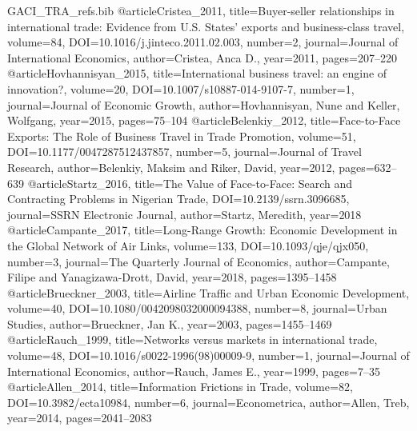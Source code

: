 \begin{filecontents*}[overwrite]{GACI_TRA_refs.bib}
@article{Cristea_2011, title={Buyer-seller relationships in international trade: Evidence from U.S. States' exports and business-class travel}, volume={84}, DOI={10.1016/j.jinteco.2011.02.003}, number={2}, journal={Journal of International Economics}, author={Cristea, Anca D.}, year={2011}, pages={207--220} }
@article{Hovhannisyan_2015, title={International business travel: an engine of innovation?}, volume={20}, DOI={10.1007/s10887-014-9107-7}, number={1}, journal={Journal of Economic Growth}, author={Hovhannisyan, Nune and Keller, Wolfgang}, year={2015}, pages={75--104} }
@article{Belenkiy_2012, title={Face-to-Face Exports: The Role of Business Travel in Trade Promotion}, volume={51}, DOI={10.1177/0047287512437857}, number={5}, journal={Journal of Travel Research}, author={Belenkiy, Maksim and Riker, David}, year={2012}, pages={632--639} }
@article{Startz_2016, title={The Value of Face-to-Face: Search and Contracting Problems in Nigerian Trade}, DOI={10.2139/ssrn.3096685}, journal={SSRN Electronic Journal}, author={Startz, Meredith}, year={2018} }
@article{Campante_2017, title={Long-Range Growth: Economic Development in the Global Network of Air Links}, volume={133}, DOI={10.1093/qje/qjx050}, number={3}, journal={The Quarterly Journal of Economics}, author={Campante, Filipe and Yanagizawa-Drott, David}, year={2018}, pages={1395--1458} }
@article{Brueckner_2003, title={Airline Traffic and Urban Economic Development}, volume={40}, DOI={10.1080/0042098032000094388}, number={8}, journal={Urban Studies}, author={Brueckner, Jan K.}, year={2003}, pages={1455--1469} }
@article{Rauch_1999, title={Networks versus markets in international trade}, volume={48}, DOI={10.1016/s0022-1996(98)00009-9}, number={1}, journal={Journal of International Economics}, author={Rauch, James E.}, year={1999}, pages={7--35} }
@article{Allen_2014, title={Information Frictions in Trade}, volume={82}, DOI={10.3982/ecta10984}, number={6}, journal={Econometrica}, author={Allen, Treb}, year={2014}, pages={2041--2083} }

\end{filecontents*}
